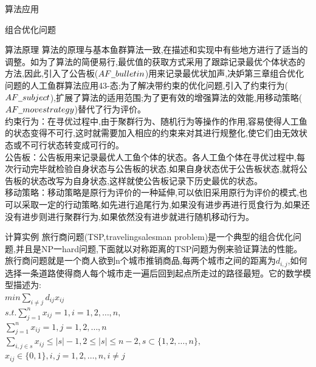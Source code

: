 \documentclass[UTF8]{ctexart}
\begin{document}
\begin{section}{算法应用}
\begin{subsection}{组合优化问题}
\begin{subsubsection}{算法原理}
算法的原理与基本鱼群算法一致,在描述和实现中有些地方进行了适当的调整。如为了算法的简便易行,最优值的获取方式采用了跟踪记录最优个体状态的方法,因此,引入了公告板($AF\underline{\hspace{0.5em}}bulletin$)用来记录最优状加声,决妒第三章组合优化问题的人工鱼群算法应用43-态;为了解决带约束的优化问题,引入了约束行为($AF\underline{\hspace{0.5em}}subject$),扩展了算法的适用范围;为了更有效的增强算法的效能,用移动策略($AF\underline{\hspace{0.5em}}movestrategy$)替代了行为评价。\\
约束行为：在寻优过程中,由于聚群行为、随机行为等操作的作用,容易使得人工鱼的状态变得不可行,这时就需要加入相应的约束来对其进行规整化,使它们由无效状态或不可行状态转变成可行的。\\
\hspace{2em}公告板：公告板用来记录最优人工鱼个体的状态。各人工鱼个体在寻优过程中,每次行动完毕就检验自身状态与公告板的状态,如果自身状态优于公告板状态,就将公告板的状态改写为自身状态,这样就使公告板记录下历史最优的状态。\\
\hspace{2em}移动策略：移动策略是原行为评价的一种延伸,可以依旧采用原行为评价的模式,也可以采取一定的行动策略,如先进行追尾行为,如果没有进步再进行觅食行为,如果还没有进步则进行聚群行为,如果依然没有进步就进行随机移动行为。
\end{subsubsection}
\begin{subsubsection}{计算实例}
旅行商问题(TSP,travelingsalesman problem)是一个典型的组合优化问题,并且是NP一hard问题,下面就以对称距离的TSP问题为例来验证算法的性能。\\
旅行商问题就是一个商人欲到n个城市推销商品,每两个城市之间的距离为$d_{i,j}$,如何选择一条道路使得商人每个城市走一遍后回到起点所走过的路径最短。它的数学模型描述为:\\
$min\sum_{i\ne j}d_{ij}x_{ij}$\\
$s.t.\sum_{j=1}^n x_{ij}=1,i=1,2,…,n,$\\
\indent $\sum_{j=1}^n x_{ij}=1,j=1,2,…,n$\\
\indent $\sum_{i,j \in s} x_{ij}\le |s|-1,2\le|s|\le n-2, s\subset \{ 1,2,…,n\},$\\
\indent $x_{ij}\in \{0,1\},i,j=1,2,…,n,i\ne j$


\end{subsubsection}
\end{subsection}
\end{section}
\end{document}
